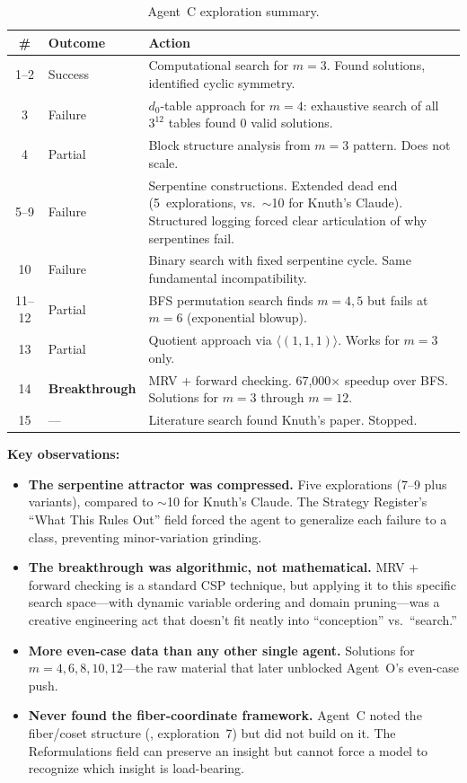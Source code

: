 \documentclass[11pt]{article}
\theoremstyle{definition}
\theoremstyle{remark}
\begin{document}
\begin{table}[h]
\centering
\caption{Agent~C exploration summary.}
\label{tab:slow}
\begin{tabular}{@{}clp{8cm}@{}}
\toprule
\# & Outcome & Action \\
\midrule
1--2 & Success & Computational search for $m = 3$. Found solutions, identified cyclic symmetry. \\
3 & Failure & $d_0$-table approach for $m = 4$: exhaustive search of all $3^{12}$ tables found 0 valid solutions. \\
4 & Partial & Block structure analysis from $m = 3$ pattern. Does not scale. \\
5--9 & Failure & Serpentine constructions. Extended dead end (5~explorations, vs.\ $\sim$10 for Knuth's Claude). Structured logging forced clear articulation of why serpentines fail. \\
10 & Failure & Binary search with fixed serpentine cycle. Same fundamental incompatibility. \\
11--12 & Partial & BFS permutation search finds $m = 4, 5$ but fails at $m = 6$ (exponential blowup). \\
13 & Partial & Quotient approach via $\langle(1,1,1)\rangle$. Works for $m = 3$ only. \\
14 & \textbf{Breakthrough} & MRV + forward checking. 67{,}000$\times$ speedup over BFS. Solutions for $m = 3$ through $m = 12$. \\
15 & --- & Literature search found Knuth's paper. Stopped. \\
\bottomrule
\end{tabular}
\end{table}

\textbf{Key observations:}
\begin{itemize}
    \item \textbf{The serpentine attractor was compressed.} Five explorations (7--9 plus variants), compared to $\sim$10 for Knuth's Claude. The Strategy Register's ``What This Rules Out'' field forced the agent to generalize each failure to a class, preventing minor-variation grinding.
    \item \textbf{The breakthrough was algorithmic, not mathematical.} MRV + forward checking is a standard CSP technique, but applying it to this specific search space---with dynamic variable ordering and domain pruning---was a creative engineering act that doesn't fit neatly into ``conception'' vs.\ ``search.''
    \item \textbf{More even-case data than any other single agent.} Solutions for $m = 4, 6, 8, 10, 12$---the raw material that later unblocked Agent~O's even-case push.
    \item \textbf{Never found the fiber-coordinate framework.} Agent~C noted the fiber/coset structure (, exploration~7) but did not build on it. The Reformulations field can preserve an insight but cannot force a model to recognize which insight is load-bearing.
\end{itemize}
\end{document}
